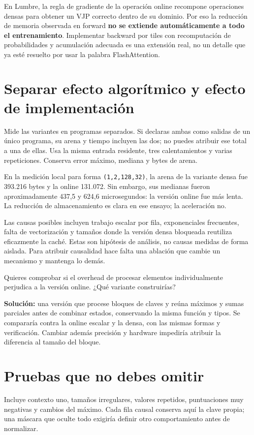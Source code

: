 \documentclass[12pt,a4paper,oneside]{report}
\begin{document}
En Lumbre, la regla de gradiente de la operación online recompone operaciones densas para obtener un VJP correcto dentro de su dominio. Por eso la reducción de memoria observada en forward \textbf{no se extiende automáticamente a todo el entrenamiento}. Implementar backward por tiles con recomputación de probabilidades y acumulación adecuada es una extensión real, no un detalle que ya esté resuelto por usar la palabra FlashAttention.

\section{Separar efecto algorítmico y efecto de implementación}
Mide las variantes en programas separados. Si declaras ambas como salidas de un único programa, su arena y tiempo incluyen las dos; no puedes atribuir ese total a una de ellas. Usa la misma entrada residente, tres calentamientos y varias repeticiones. Conserva error máximo, mediana y bytes de arena.

En la medición local para forma \texttt{(1,2,128,32)}, la arena de la variante densa fue 393.216 bytes y la online 131.072. Sin embargo, sus medianas fueron aproximadamente 437,5 y 624,6 microsegundos: la versión online fue más lenta. La reducción de almacenamiento es clara en ese ensayo; la aceleración no.

Las causas posibles incluyen trabajo escalar por fila, exponenciales frecuentes, falta de vectorización y tamaños donde la versión densa bloqueada reutiliza eficazmente la caché. Estas son hipótesis de análisis, no causas medidas de forma aislada. Para atribuir causalidad hace falta una ablación que cambie un mecanismo y mantenga lo demás.

\begin{practica}
Quieres comprobar si el overhead de procesar elementos individualmente perjudica a la versión online. ¿Qué variante construirías?

\textbf{Solución:} una versión que procese bloques de claves y reúna máximos y sumas parciales antes de combinar estados, conservando la misma función y tipos. Se compararía contra la online escalar y la densa, con las mismas formas y verificación. Cambiar además precisión y hardware impediría atribuir la diferencia al tamaño del bloque.

\end{practica}
\section{Pruebas que no debes omitir}
Incluye contexto uno, tamaños irregulares, valores repetidos, puntuaciones muy negativas y cambios del máximo. Cada fila causal conserva aquí la clave propia; una máscara que oculte todo exigiría definir otro comportamiento antes de normalizar.
\end{document}
